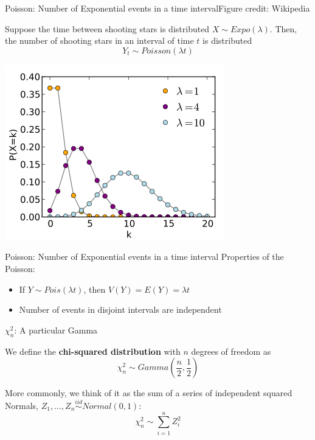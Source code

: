 \documentclass{beamer}
\begin{document}
\begin{frame}{Poisson: Number of Exponential events in a time interval}{Figure credit: Wikipedia}
\begin{definition}
Suppose the time between shooting stars is distributed $X\sim Expo(\lambda)$. Then, the number of shooting stars in an interval of time $t$ is distributed
$$Y_t\sim Poisson(\lambda t)$$
\end{definition}
\begin{center}\includegraphics[scale=.3]{figures/PoissonPMF.png}\end{center}
\end{frame}

\begin{frame}{Poisson: Number of Exponential events in a time interval}
Properties of the Poisson:
\begin{itemize}
\item If $Y\sim Pois(\lambda t)$, then $V(Y)=E(Y)=\lambda t$
\item Number of events in disjoint intervals are independent
\end{itemize}
\end{frame}

\begin{frame}{$\chi^2_n$: A particular Gamma}
\begin{definition}
We define the \textbf{chi-squared distribution} with $n$ degrees of freedom as
$$\chi^2_n\sim Gamma\left(\frac{n}{2},\frac{1}{2}\right)$$
\end{definition}
More commonly, we think of it as the sum of a series of independent squared Normals, $Z_1,\dots,Z_n\stackrel{iid}{\sim}Normal(0,1)$:
$$\chi^2_n\sim \sum_{i=1}^n Z_i^2$$
\end{frame}
\end{document}

